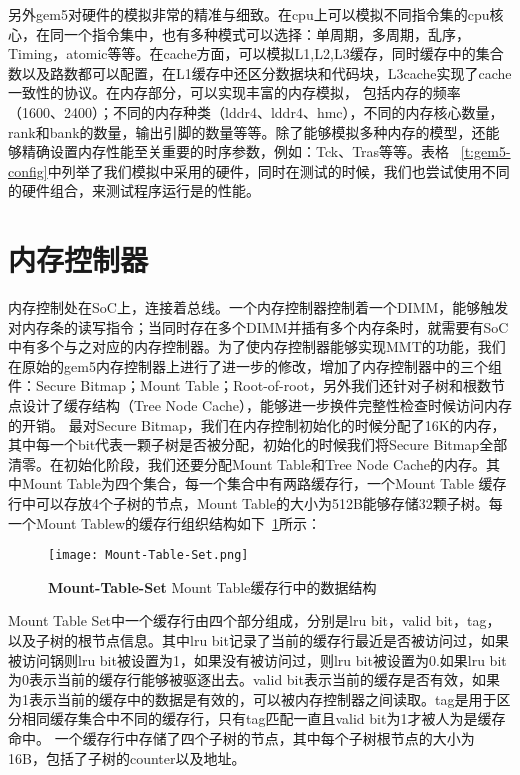 另外gem5对硬件的模拟非常的精准与细致。在cpu上可以模拟不同指令集的cpu核心，在同一个指令集中，也有多种模式可以选择：单周期，多周期，乱序，Timing，atomic等等。在cache方面，可以模拟L1,L2,L3缓存，同时缓存中的集合数以及路数都可以配置，在L1缓存中还区分数据块和代码块，L3cache实现了cache一致性的协议。在内存部分，可以实现丰富的内存模拟，
包括内存的频率（1600、2400）；不同的内存种类（lddr4、lddr4、hmc），不同的内存核心数量，rank和bank的数量，输出引脚的数量等等。除了能够模拟多种内存的模型，还能够精确设置内存性能至关重要的时序参数，例如：Tck、Tras等等。表格 ~\ref{t:gem5-config}中列举了我们模拟中采用的硬件，同时在测试的时候，我们也尝试使用不同的硬件组合，来测试程序运行是的性能。

\section{内存控制器}
内存控制处在SoC上，连接着总线。一个内存控制器控制着一个DIMM，能够触发对内存条的读写指令；当同时存在多个DIMM并插有多个内存条时，就需要有SoC中有多个与之对应的内存控制器。为了使内存控制器能够实现MMT的功能，我们在原始的gem5内存控制器上进行了进一步的修改，增加了内存控制器中的三个组件：Secure Bitmap；Mount Table；Root-of-root，另外我们还针对子树和根数节点设计了缓存结构（Tree Node Cache），能够进一步换件完整性检查时候访问内存的开销。
最对Secure Bitmap，我们在内存控制初始化的时候分配了16K的内存，其中每一个bit代表一颗子树是否被分配，初始化的时候我们将Secure Bitmap全部清零。在初始化阶段，我们还要分配Mount Table和Tree Node Cache的内存。其中Mount Table为四个集合，每一个集合中有两路缓存行，一个Mount Table 缓存行中可以存放4个子树的节点，Mount Table的大小为512B能够存储32颗子树。每一个Mount Tablew的缓存行组织结构如下~\ref{fig:Mount-Table-Set.png}所示：

\begin{figure}[!htp]
    \centering
    \texttt{[image: Mount-Table-Set.png]}
    \caption{\textbf{Mount-Table-Set }Mount Table缓存行中的数据结构}
   \label{fig:Mount-Table-Set.png}
\end{figure}
Mount Table Set中一个缓存行由四个部分组成，分别是lru bit，valid bit，tag，以及子树的根节点信息。其中lru bit记录了当前的缓存行最近是否被访问过，如果被访问锅则lru bit被设置为1，如果没有被访问过，则lru bit被设置为0.如果lru bit为0表示当前的缓存行能够被驱逐出去。valid bit表示当前的缓存是否有效，如果为1表示当前的缓存中的数据是有效的，可以被内存控制器之间读取。tag是用于区分相同缓存集合中不同的缓存行，只有tag匹配一直且valid bit为1才被人为是缓存命中。
一个缓存行中存储了四个子树的节点，其中每个子树根节点的大小为16B，包括了子树的counter以及地址。

